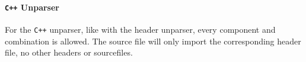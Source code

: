 \documentclass{report}
\begin{document}
\paragraph{\texttt{C++} Unparser}
For the \texttt{C++} unparser, like with the header unparser, every component and combination is allowed. The source file will only import the corresponding header file, no other headers or sourcefiles.




\newpage
\pagestyle{empty}


\end{document}
